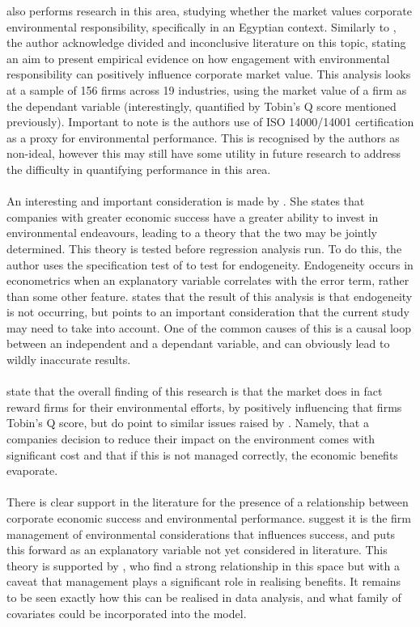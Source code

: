 {\cite{wahba2008does} also performs research in this area, studying whether the market values corporate environmental responsibility, specifically in an Egyptian context. Similarly to \cite{schaltegger2002link}, the author acknowledge divided and inconclusive literature on this topic, stating an aim to present empirical evidence on how engagement with environmental responsibility can positively influence corporate market value. This analysis looks at a sample of 156 firms across 19 industries, using the market value of a firm as the dependant variable (interestingly, quantified by Tobin's Q score mentioned previously). Important to note is the authors use of ISO 14000/14001 certification as a proxy for environmental performance. This is recognised by the authors as non-ideal, however this may still have some utility in future research to address the difficulty in quantifying performance in this area. \\\\
An interesting and important consideration is made by \cite{wahba2008does}. She states that companies with greater economic success have a greater ability to invest in environmental endeavours, leading to a theory that the two may be jointly determined. This theory is tested before regression analysis run. To do this, the author uses the specification test of \cite{hausman1978specification} to test for endogeneity. Endogeneity occurs in econometrics when an explanatory variable correlates with the error term, rather than some other feature. \cite{wahba2008does} states that the result of this analysis is that endogeneity is not occurring, but points to an important consideration that the current study may need to take into account. One of the common causes of this is a causal loop between an independent and a dependant variable, and can obviously lead to wildly inaccurate results. \\\\
 \cite{wahba2008does} state that the overall finding of this research is that the market does in fact reward firms for their environmental efforts, by positively influencing that firms Tobin's Q score, but do point to similar issues raised by \cite{schaltegger2002link}. Namely, that a companies decision to reduce their impact on the environment comes with significant cost and that if this is not managed correctly, the economic benefits evaporate.     \\\\
There is clear support in the literature for the presence of a relationship between corporate economic success and environmental performance. \cite{schaltegger2002link} suggest it is the firm management of environmental considerations that influences success, and puts this forward as an explanatory variable not yet considered in literature. This theory is supported by \cite{wahba2008does}, who find a strong relationship in this space but with a caveat that management plays a significant role in realising benefits. It remains to be seen exactly how this can be realised in data analysis, and what family of covariates could be incorporated into the model.}
